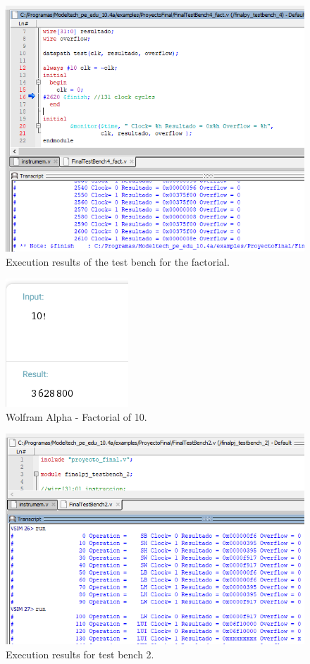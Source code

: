 \documentclass[conference]{IEEEtran}
\begin{document}
\begin{figure}[h]
\includegraphics[scale=0.5]{ModelSim_factorial4_clock_cycles.png}
\caption{Execution results of the test bench for the factorial.}
\label{result_factorial}
\end{figure}

\begin{figure}[h]
\begin{center}
\includegraphics[scale=0.7]{factorial_10.png}
\caption{Wolfram Alpha - Factorial of 10. \cite{b6}}
\label{result_factorial}
\end{center}
\end{figure}

\begin{figure}[h]
\includegraphics[scale=0.5]{ModelSim_testbench2_clock_cycles.png}
\caption{Execution results for test bench 2.}
\label{result2}
\end{figure}
\end{document}
